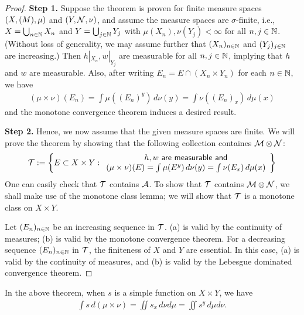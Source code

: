 \begin{proof}
    \indent\textbf{Step 1.}
    Suppose the theorem is proven for finite measure spaces $(X, {\mathcal{(}}M), \mu)$ and $(Y, {\mathcal{N}}, \nu)$, and assume the measure spaces are $\sigma$-finite, i.e., $X=\bigcup_{n\in{\mathbb{N}}} X_n$ and $Y=\bigcup_{j\in{\mathbb{N}}} Y_j$ with $\mu(X_n), \nu(Y_j)<\infty$ for all $n, j\in{\mathbb{N}}$.
    (Without loss of generality, we may assume further that $(X_n)_{n\in{\mathbb{N}}}$ and $(Y_j)_{j\in{\mathbb{N}}}$ are increasing.)
    Then $h|_{X_n}, w|_{Y_j}$ are measurable for all $n, j\in{\mathbb{N}}$, implying that $h$ and $w$ are measurable.
    Also, after writing $E_n=E\cap (X_n\times Y_n)$ for each $n\in{\mathbb{N}}$, we have
    \begin{align*}
        (\mu\times\nu)(E_n)=\int\mu((E_n)^y)\,d\nu(y)=\int\nu((E_n)_x)\,d\mu(x)
    \end{align*}
    and the monotone convergence theorem induces a desired result.

    \indent\textbf{Step 2.}
    Hence, we now assume that the given measure spaces are finite.
    We will prove the theorem by showing that the following collection containes ${\mathcal{M}}\otimes{\mathcal{N}}$:
    \begin{align*}
        {\mathcal{T}}:=\left\{
            E\subset X\times Y:
            \begin{array}{c}
                \textsf{$h, w$ are measurable and}\\
                \textsf{$(\mu\times\nu)(E)=\int\mu(E^y)\,d\nu(y)=\int\nu(E_x)\,d\mu(x)$}
            \end{array}
        \right\}
    \end{align*}
    One can easily check that ${\mathcal{T}}$ contains ${\mathcal{A}}$.
    To show that ${\mathcal{T}}$ contains ${\mathcal{M}}\otimes{\mathcal{N}}$, we shall make use of the monotone class lemma; we will show that ${\mathcal{T}}$ is a monotone class on $X\times Y$.
    
    Let $(E_n)_{n\in{\mathbb{N}}}$ be an increasing sequence in ${\mathcal{T}}$.
    (a) is valid by the continuity of measures; (b) is valid by the monotone convergence theorem.
    For a decreasing sequence $(E_n)_{n\in{\mathbb{N}}}$ in ${\mathcal{T}}$, the finiteness of $X$ and $Y$ are essential.
    In this case, (a) is valid by the continuity of measures, and (b) is valid by the Lebesgue dominated convergence theorem.
\end{proof}
In the above theorem, when $s$ is a simple function on $X\times Y$, we have
\begin{align*}
    \int s\,d(\mu\times\nu)=\iint s_x\,d\nu d\mu=\iint s^y\,d\mu d\nu.
\end{align*}
